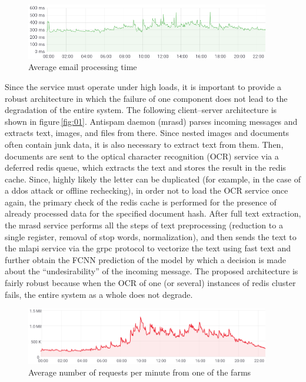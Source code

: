 \documentclass[12pt]{jpconf}
\begin{document}
\begin{figure}[b]
	\center
	\includegraphics[width=0.95\textwidth]{images/timings.png}
	\caption{\label{fig:02} Average email processing time}	
\end{figure}

Since the service must operate under high loads, it is important to provide a robust architecture in which the failure of one component does not lead to the degradation of the entire system. The following client--server architecture is shown in figure\,\ref{fig:01}. Antispam daemon (mrasd) parses incoming messages and extracts text, images, and files from there. Since nested images and documents often contain junk data, it is also necessary to extract text from them. Then, documents are sent to the optical character recognition (OCR) service via a deferred redis queue, which extracts the text and stores the result in the redis cache.
Since, highly likely the letter can be duplicated (for example, in the case of a ddos attack or offline rechecking), in order not to load the OCR service once again, the primary check of the redis cache is performed for the presence of already processed data for the specified document hash.
After full text extraction, the mrasd service performs all the steps of text preprocessing (reduction to a single register, removal of stop words, normalization), and then sends the text to the mlapi service via the grpc protocol to vectorize the text using fast text and further obtain the FCNN prediction of the model by which a decision is made about the ``undesirability'' of the incoming message.
The proposed architecture is fairly robust because when the OCR of one (or several) instances of redis cluster fails, the entire system as a whole does not degrade.
 
\begin{figure}[t]
	\center
	\includegraphics[width=0.95\textwidth]{images/processed_messages.png}
	\caption{\label{fig:03} Average number of requests per minute from one of the farms}
\end{figure}
\end{document}
